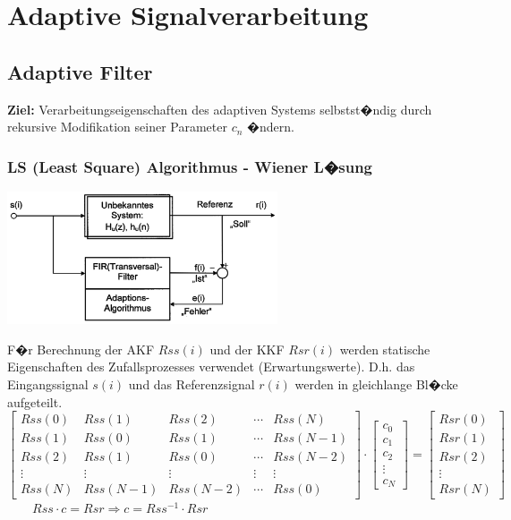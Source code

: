 
\begin{minipage}{11cm}
\section{Adaptive Signalverarbeitung}
\subsection{Adaptive Filter}
\textbf{Ziel:} Verarbeitungseigenschaften des adaptiven Systems selbstst�ndig durch rekursive Modifikation seiner Parameter $c_n$ �ndern.

\subsubsection{LS (Least Square) Algorithmus - Wiener L�sung}

\end{minipage}
\begin{minipage}{8cm}
\includegraphics[width=8cm,trim= 0cm 0cm 0cm 0cm]{Content/AdaptSigVer/AdaptSigVer.png}
\end{minipage}

F�r Berechnung der AKF $Rss(i)$ und der KKF $Rsr(i)$ werden statische Eigenschaften des Zufallsprozesses verwendet (Erwartungswerte). D.h. das Eingangssignal $s(i)$ und das Referenzsignal $r(i)$ werden in gleichlange Bl�cke aufgeteilt.\\ 

$\begin{bmatrix}
    Rss(0) & Rss(1) & Rss(2) & \cdots & Rss(N) \\
    Rss(1) & Rss(0) & Rss(1) & \cdots & Rss(N-1)\\
    Rss(2) & Rss(1) & Rss(0) & \cdots & Rss(N-2) \\
    \vdots & \vdots & \vdots &  \vdots & \vdots \\
    Rss(N) & Rss(N-1) & Rss(N-2) & \cdots & Rss(0)
\end{bmatrix}
\cdot
\begin{bmatrix}
    c_0 \\
    c_1 \\
    c_2 \\
    \vdots \\
    c_N
\end{bmatrix}
=
\begin{bmatrix}
    Rsr(0) \\
    Rsr(1) \\
    Rsr(2) \\
    \vdots \\
    Rsr(N)
\end{bmatrix}$
$\qquad Rss \cdot c = Rsr \Longrightarrow c=Rss^{-1} \cdot Rsr$


